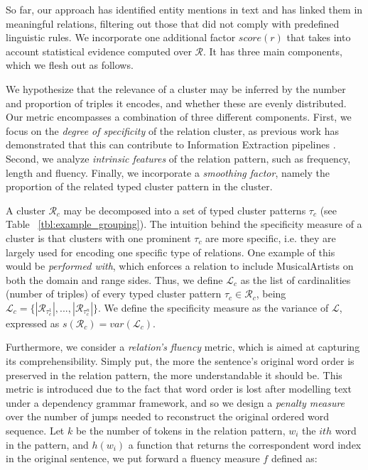 So far, our approach has identified entity mentions in text and has linked them in meaningful relations, filtering out those that did not comply with predefined linguistic rules. We incorporate one additional factor $score(r)$ that takes into account statistical evidence computed over $\mathcal{R}$. It has three main components, which we flesh out as follows.

We hypothesize that the relevance of a cluster may be inferred by the number and proportion of triples it encodes, and whether these are evenly distributed. 
Our metric encompasses a combination of three different components. First, we focus on the \textit{degree of specificity} of the relation cluster, as previous work has demonstrated that this can contribute to Information Extraction pipelines \cite{DelliBovietal2015}. Second, we analyze \textit{intrinsic features} of the relation pattern, such as frequency, length and fluency. Finally, we incorporate a \textit{smoothing factor}, namely the proportion of the related typed cluster pattern in the cluster.

A cluster $\mathcal{R}_c$ may be decomposed into a set of typed cluster patterns $\tau_c$ (see Table ~\ref{tbl:example_grouping}). The intuition behind the specificity measure of a cluster is that clusters with one prominent $\tau_c$ are more specific, i.e. they are largely used for encoding one specific type of relations. One example of this would be \textit{performed with}, which enforces a relation to include MusicalArtists on both the domain and range sides. Thus, we define $\mathcal{L}_c$ as the list of cardinalities (number of triples) of every typed cluster pattern $\tau_c \in \mathcal{R}_c$, being $\mathcal{L}_c = \{|\mathcal{R}_{\tau_c^1}|,...,|\mathcal{R}_{\tau_c^n}|\}$. We define the specificity measure as the variance of $\mathcal{L}$, expressed as $s(\mathcal{R}_c) = var(\mathcal{L}_c)$.

Furthermore, we consider a \textit{relation's fluency} metric, which is aimed at capturing its comprehensibility. Simply put, the more the sentence's original word order is preserved in the relation pattern, the more understandable it should be. This metric is introduced due to the fact that word order is lost after modelling text under a dependency grammar framework, and so we design a \textit{penalty measure} over the number of jumps needed to reconstruct the original ordered word sequence. Let $k$ be the number of tokens in the relation pattern, $w_i$ the $ith$ word in the pattern, and $h(w_i)$ a function that returns the correspondent word index in the original sentence, we put forward a fluency measure $f$ defined as:

